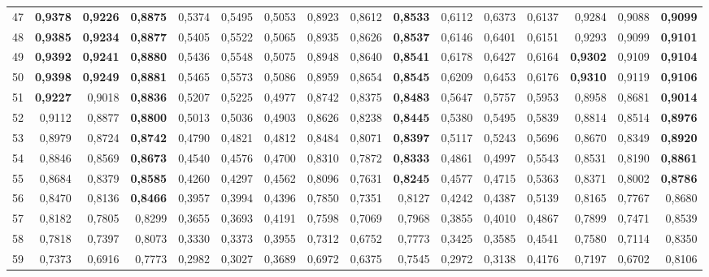 \begin{table}[htp!]
\begin{adjustwidth}{-2cm}{}
\begin{tabular}{ l | *{15}{| r}}
47	&	\textbf{0,9378}	&	\textbf{0,9226}	&	\textbf{0,8875}	&	0,5374	&	0,5495	&	0,5053	&	0,8923	&	0,8612	&	\textbf{0,8533}	&	0,6112	&	0,6373	&	0,6137	&	0,9284	&	0,9088	&	\textbf{0,9099}	\\
48	&	\textbf{0,9385}	&	\textbf{0,9234}	&	\textbf{0,8877}	&	0,5405	&	0,5522	&	0,5065	&	0,8935	&	0,8626	&	\textbf{0,8537}	&	0,6146	&	0,6401	&	0,6151	&	0,9293	&	0,9099	&	\textbf{0,9101}	\\
49	&	\textbf{0,9392}	&	\textbf{0,9241}	&	\textbf{0,8880}	&	0,5436	&	0,5548	&	0,5075	&	0,8948	&	0,8640	&	\textbf{0,8541}	&	0,6178	&	0,6427	&	0,6164	&	\textbf{0,9302}	&	0,9109	&	\textbf{0,9104}	\\
50	&	\textbf{0,9398}	&	\textbf{0,9249}	&	\textbf{0,8881}	&	0,5465	&	0,5573	&	0,5086	&	0,8959	&	0,8654	&	\textbf{0,8545}	&	0,6209	&	0,6453	&	0,6176	&	\textbf{0,9310}	&	0,9119	&	\textbf{0,9106}	\\
51	&	\textbf{0,9227}	&	0,9018	&	\textbf{0,8836}	&	0,5207	&	0,5225	&	0,4977	&	0,8742	&	0,8375	&	\textbf{0,8483}	&	0,5647	&	0,5757	&	0,5953	&	0,8958	&	0,8681	&	\textbf{0,9014}	\\
52	&	0,9112	&	0,8877	&	\textbf{0,8800}	&	0,5013	&	0,5036	&	0,4903	&	0,8626	&	0,8238	&	\textbf{0,8445}	&	0,5380	&	0,5495	&	0,5839	&	0,8814	&	0,8514	&	\textbf{0,8976}	\\
53	&	0,8979	&	0,8724	&	\textbf{0,8742}	&	0,4790	&	0,4821	&	0,4812	&	0,8484	&	0,8071	&	\textbf{0,8397}	&	0,5117	&	0,5243	&	0,5696	&	0,8670	&	0,8349	&	\textbf{0,8920}	\\
54	&	0,8846	&	0,8569	&	\textbf{0,8673}	&	0,4540	&	0,4576	&	0,4700	&	0,8310	&	0,7872	&	\textbf{0,8333}	&	0,4861	&	0,4997	&	0,5543	&	0,8531	&	0,8190	&	\textbf{0,8861}	\\
55	&	0,8684	&	0,8379	&	\textbf{0,8585}	&	0,4260	&	0,4297	&	0,4562	&	0,8096	&	0,7631	&	\textbf{0,8245}	&	0,4577	&	0,4715	&	0,5363	&	0,8371	&	0,8002	&	\textbf{0,8786}	\\
56	&	0,8470	&	0,8136	&	\textbf{0,8466}	&	0,3957	&	0,3994	&	0,4396	&	0,7850	&	0,7351	&	0,8127	&	0,4242	&	0,4387	&	0,5139	&	0,8165	&	0,7767	&	0,8680	\\
57	&	0,8182	&	0,7805	&	0,8299	&	0,3655	&	0,3693	&	0,4191	&	0,7598	&	0,7069	&	0,7968	&	0,3855	&	0,4010	&	0,4867	&	0,7899	&	0,7471	&	0,8539	\\
58	&	0,7818	&	0,7397	&	0,8073	&	0,3330	&	0,3373	&	0,3955	&	0,7312	&	0,6752	&	0,7773	&	0,3425	&	0,3585	&	0,4541	&	0,7580	&	0,7114	&	0,8350	\\
59	&	0,7373	&	0,6916	&	0,7773	&	0,2982	&	0,3027	&	0,3689	&	0,6972	&	0,6375	&	0,7545	&	0,2972	&	0,3138	&	0,4176	&	0,7197	&	0,6702	&	0,8106	\\

\end{tabular}
\end{adjustwidth}
\end{table}
